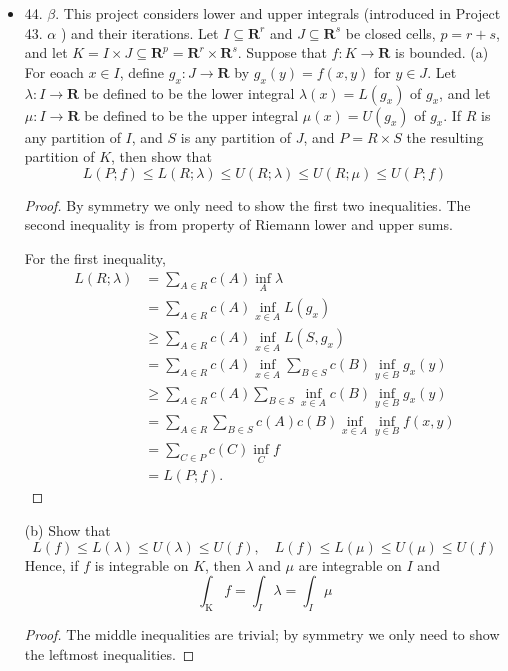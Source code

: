 \begin{itemize}
\begin{proof}
\end{proof}

\item 44. $\beta$. This project considers lower and upper integrals (introduced in Project 43. $\alpha$ ) and their iterations. Let $I \subseteq \boldsymbol{R}^r$ and $J \subseteq \boldsymbol{R}^s$ be closed cells, $p=r+s$, and let $K=I \times J \subseteq \boldsymbol{R}^p=\boldsymbol{R}^r \times \boldsymbol{R}^s$. Suppose that $f: K \rightarrow \boldsymbol{R}$ is bounded.
(a) For eoach $x \in I$, define $g_x: J \rightarrow \boldsymbol{R}$ by $g_x(y)=f(x, y)$ for $y \in J$. Let $\lambda: I \rightarrow \boldsymbol{R}$ be defined to be the lower integral $\lambda(x)=L\left(g_x\right)$ of $g_x$, and let $\mu: I \rightarrow \boldsymbol{R}$ be defined to be the upper integral $\mu(x)=U\left(g_x\right)$ of $g_x$. If $R$ is any partition of $I$, and $S$ is any partition of $J$, and $P=R \times S$ the resulting partition of $K$, then show that
\[
L(P ; f) \leq L(R ; \lambda) \leq U(R ; \lambda) \leq U(R ; \mu) \leq U(P ; f)
\]
\begin{proof}
	By symmetry we only need to show the first two inequalities. The second inequality is from property of Riemann lower and upper sums.

	For the first inequality,
	\begin{align*}
		L(R;\lambda)
		&= \sum_{A \in R} c(A) \inf _{A} \lambda \\
		&= \sum_{A \in R} c(A) \inf _{x \in A} L(g_x) \\
		&\ge \sum_{A \in R} c(A) \inf _{x \in A} L(S, g_x) \\
		&= \sum_{A \in R} c(A) \inf _{x \in A} \sum_{B \in S} c(B) \inf_{y \in B} g_x(y) \\
		&\ge   \sum_{A \in R} c(A) \sum_{B \in S} \inf _{x \in A}  c(B) \inf_{y \in B} g_x(y) \\
		&=   \sum_{A \in R} \sum_{B \in S} c(A)c(B)  \inf _{x \in A}  \inf_{y \in B} f(x,y) \\
		&=   \sum_{C \in P} c(C)  \inf _{C}   f \\
		&= L(P; f)
	.\end{align*}
\end{proof}

(b) Show that
\[
L(f) \leq L(\lambda) \leq U(\lambda) \leq U(f), \quad L(f) \leq L(\mu) \leq U(\mu) \leq U(f)
\]
Hence, if $f$ is integrable on $K$, then $\lambda$ and $\mu$ are integrable on $I$ and
\[
\int_{\mathrm{K}} f=\int_I \lambda=\int_I \mu
\]
\begin{proof}
	The middle inequalities are trivial; by symmetry we only need to show the leftmost inequalities.


\end{proof}
\end{itemize}
